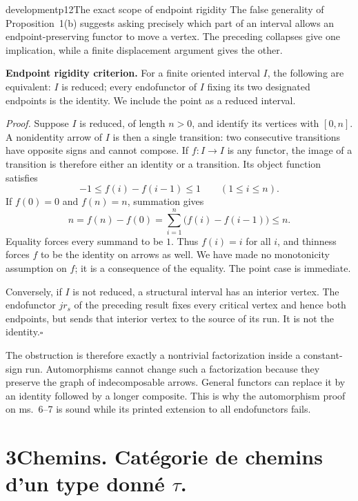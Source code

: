 \begin{dcomment}{development}{p12}{The exact scope of endpoint rigidity}
The false generality of Proposition~1(b) suggests asking precisely which part of an interval allows an endpoint-preserving functor to move a vertex. The preceding collapses give one implication, while a finite displacement argument gives the other.

\textbf{Endpoint rigidity criterion.}\ours{}
For a finite oriented interval $I$, the following are equivalent: $I$ is reduced; every endofunctor of $I$ fixing its two designated endpoints is the identity. We include the point as a reduced interval.

\emph{Proof.} Suppose $I$ is reduced, of length $n>0$, and identify its vertices with $[0,n]$. A nonidentity arrow of $I$ is then a single transition: two consecutive transitions have opposite signs and cannot compose. If $f:I\to I$ is any functor, the image of a transition is therefore either an identity or a transition. Its object function satisfies
\[
 -1\leq f(i)-f(i-1)\leq1\qquad(1\leq i\leq n).
\]
If $f(0)=0$ and $f(n)=n$, summation gives
\[
 n=f(n)-f(0)=\sum_{i=1}^n\bigl(f(i)-f(i-1)\bigr)\leq n.
\]
Equality forces every summand to be $1$. Thus $f(i)=i$ for all $i$, and thinness forces $f$ to be the identity on arrows as well. We have made no monotonicity assumption on $f$; it is a consequence of the equality. The point case is immediate.

Conversely, if $I$ is not reduced, a structural interval has an interior vertex. The endofunctor $j r_s$ of the preceding result fixes every critical vertex and hence both endpoints, but sends that interior vertex to the source of its run. It is not the identity.\hfill$\square$

The obstruction is therefore exactly a nontrivial factorization inside a constant-sign run. Automorphisms cannot change such a factorization because they preserve the graph of indecomposable arrows. General functors can replace it by an identity followed by a longer composite. This is why the automorphism proof on ms.~6--7 is sound while its printed extension to all endofunctors fails.
\end{dcomment}


\section*{3\quad Chemins. Catégorie de chemins d'un type donné $\tau$.}

